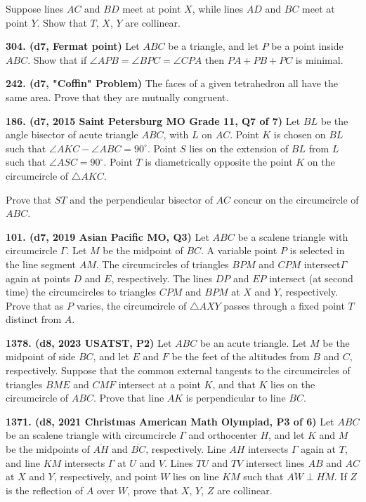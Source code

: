 \documentclass{article}
\begin{document}
Suppose lines $AC$ and $BD$ meet at point $X$, while lines $AD$ and $BC$ meet at point $Y$. Show that $T$, $X$, $Y$ are collinear.

\textbf{304. (\color{red}d7\color{black}, Fermat point)} Let \(ABC\) be a triangle, and let \(P\) be a point inside \(ABC\). Show that if \(\angle APB = \angle BPC = \angle CPA\) then \(PA + PB + PC\) is minimal.

\textbf{242. (\color{red}d7\color{black}, "Coffin" Problem)} The faces of a given tetrahedron all have the same area. Prove that they are mutually congruent.

\textbf{186. (\color{red}d7\color{black}, 2015 Saint Petersburg MO Grade 11, Q7 of 7)} Let $BL$ be the angle bisector of acute triangle $ABC$, with $L$ on $AC$. Point $K$ is chosen on $BL$ such that $\angle AKC - \angle ABC = 90^{\circ}$. Point $S$ lies on the extension of $BL$ from $L$ such that $\angle ASC = 90^{\circ}$. Point $T$ is diametrically opposite the point $K$ on the circumcircle of $\triangle AKC$.

Prove that $ST$ and the perpendicular bisector of $AC$ concur on the circumcircle of $ABC$.

\textbf{101. (\color{red}d7\color{black}, 2019 Asian Pacific MO, Q3)} Let \(ABC\) be a scalene triangle with circumcircle $\Gamma{}$. Let \(M\) be the midpoint of \(BC\). A variable point \(P\) is selected in the line segment \(AM\). The circumcircles of triangles $BPM$ and $CPM$ intersect$ \Gamma{}$ again at points $D$ and $E$, respectively. The lines $DP$ and $EP$ intersect (at second time) the circumcircles to triangles $CPM$ and $BPM$ at $X$ and $Y$, respectively. Prove that as $P$ varies, the circumcircle of $\triangle AXY$ passes through a fixed point $T$ distinct from $A$.

\textbf{1378. (\color{red}d8\color{black}, 2023 USATST, P2)} Let $ABC$ be an acute triangle. Let $M$ be the midpoint of side $BC$, and let $E$ and $F$ be the feet of the altitudes from $B$ and $C$, respectively. Suppose that the common external tangents to the circumcircles of triangles $BME$ and $CMF$ intersect at a point $K$, and that $K$ lies on the circumcircle of $ABC$. Prove that line $AK$ is perpendicular to line $BC$.


\textbf{1371. (\color{red}d8\color{black}, 2021 Christmas American Math Olympiad, P3 of 6)} Let $ABC$ be an scalene triangle with circumcircle $\Gamma$ and orthocenter $H$, and let $K$ and $M$ be the midpoints of $\overline{AH}$ and $\overline{BC}$, respectively. Line $AH$ intersects $\Gamma$ again at $T$, and line $KM$ intersects $\Gamma$ at $U$ and $V$. Lines $TU$ and $TV$ intersect lines $AB$ and $AC$ at $X$ and $Y$, respectively, and point $W$ lies on line $KM$ such that $\overline{AW}\perp\overline{HM}$. If $Z$ is the reflection of $A$ over $W$, prove that $X$, $Y$, $Z$ are collinear.
\end{document}
